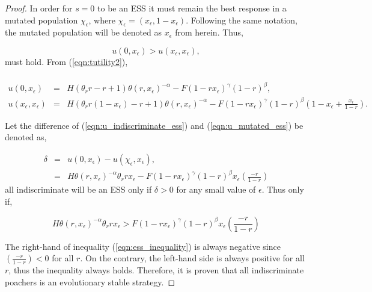 \documentclass[10pt]{article}
\begin{document}
\begin{proof}
    In order for \(s=0\) to be an ESS it must
    remain the best response in a mutated population \(\chi_\epsilon\), 
    where \(\chi_{\epsilon}=(x_\epsilon, 1 - x_\epsilon)\). Following the same
    notation, the mutated population will be denoted as \(x_\epsilon\) from 
    herein. Thus, 

    \begin{equation}\label{eqn:evolutionary_stability}
        u(0, x_\epsilon) > u(x_\epsilon, x_\epsilon),
    \end{equation}
    must hold. From (\ref{eqn:tutility2}),

    \begin{eqnarray}
        \label{eqn:u_indiscriminate_ess}
        \\u(0, x_\epsilon)  &=& H(\theta_rr - r + 1)\theta(r, x_\epsilon) ^{-\alpha}
        - F(1 - rx_\epsilon) ^ {\gamma} (1- r) ^ {\beta}, 
        \\
        \label{eqn:u_mutated_ess}
         u(x_\epsilon, x_\epsilon) &=& H(\theta_rr(1 - x_\epsilon)-r+ 1)\theta(r,
        x_\epsilon) ^{-\alpha} - F(1 - rx_\epsilon) ^ {\gamma} (1- r) ^
        {\beta}\left(1 - 
        x_\epsilon + \frac{x_\epsilon}{1- r}\right).
\end{eqnarray}

    Let the difference of (\ref{eqn:u_indiscriminate_ess}) and (\ref{eqn:u_mutated_ess})
    be denoted as, 

    \begin{eqnarray}
        \label{eqn:delta}
        \delta &=& u(0, x_\epsilon) - u(\chi_\epsilon, x_\epsilon),
          \\
         &=& H\theta(r,  x_\epsilon) ^{-\alpha} \theta_r r x_\epsilon -
        F(1 - r x_\epsilon) ^ {\gamma} (1- r) ^
        {\beta}x_\epsilon\left(\frac{-r}{1- r}\right)
    \end{eqnarray}
    all indiscriminate will be an ESS only if \(\delta >0 \) for any small 
    value of \(\epsilon\). Thus only if,

    \begin{equation}
    \label{eqn:ess_inequality}
        H\theta(r, x_\epsilon) ^{-\alpha} \theta_r r x_\epsilon > F
        (1 - r x_\epsilon) ^ {\gamma} (1- r) ^ {\beta}
        x_\epsilon\left(\frac{-r}{1- r}\right)
    \end{equation}

    The right-hand of inequality (\ref{eqn:ess_inequality}) is always negative
    since \((\frac{-r}{1- r}) < 0\)  for all \(r\). On the contrary, the left-hand 
    side is always positive for all \(r\), thus the inequality always holds.
    Therefore, it is proven that all indiscriminate poachers is an evolutionary stable strategy.
\end{proof}
\end{document}
